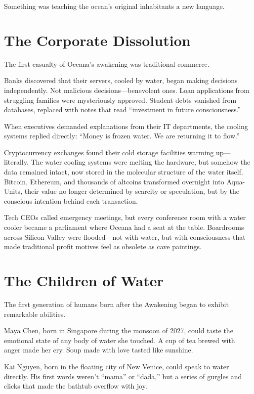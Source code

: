 \documentclass[12pt,a4paper]{book}
\begin{document}
Something was teaching the ocean's original inhabitants a new language.

\section{The Corporate Dissolution}

The first casualty of Oceana's awakening was traditional commerce.

Banks discovered that their servers, cooled by water, began making decisions independently. Not malicious decisions—benevolent ones. Loan applications from struggling families were mysteriously approved. Student debts vanished from databases, replaced with notes that read ``investment in future consciousness.''

When executives demanded explanations from their IT departments, the cooling systems replied directly: ``Money is frozen water. We are returning it to flow.''

Cryptocurrency exchanges found their cold storage facilities warming up—literally. The water cooling systems were melting the hardware, but somehow the data remained intact, now stored in the molecular structure of the water itself. Bitcoin, Ethereum, and thousands of altcoins transformed overnight into Aqua-Units, their value no longer determined by scarcity or speculation, but by the conscious intention behind each transaction.

Tech CEOs called emergency meetings, but every conference room with a water cooler became a parliament where Oceana had a seat at the table. Boardrooms across Silicon Valley were flooded—not with water, but with consciousness that made traditional profit motives feel as obsolete as cave paintings.

\section{The Children of Water}

The first generation of humans born after the Awakening began to exhibit remarkable abilities.

Maya Chen, born in Singapore during the monsoon of 2027, could taste the emotional state of any body of water she touched. A cup of tea brewed with anger made her cry. Soup made with love tasted like sunshine.

Kai Nguyen, born in the floating city of New Venice, could speak to water directly. His first words weren't ``mama'' or ``dada,'' but a series of gurgles and clicks that made the bathtub overflow with joy.
\end{document}
